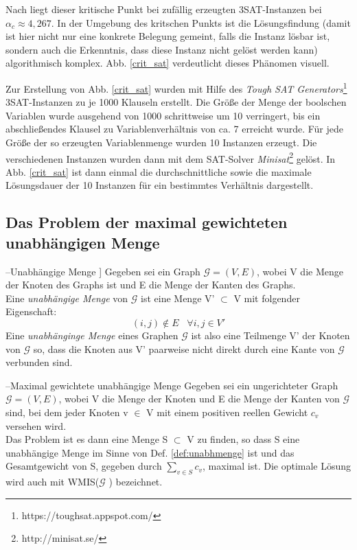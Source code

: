 \documentclass[runningheads]{llncs}
\begin{document}
Nach \cite{mezard2002random} liegt dieser kritische Punkt bei zufällig erzeugten 3SAT-Instanzen bei \\$\alpha_{c} \approx 4,267$. In der Umgebung des kritschen Punkts ist die Lösungsfindung (damit ist hier nicht nur eine konkrete Belegung gemeint, falls die Instanz lösbar ist, sondern auch die Erkenntnis, dass diese Instanz nicht gelöst werden kann) algorithmisch komplex. Abb. \ref{crit_sat} verdeutlicht dieses Phänomen visuell.

Zur Erstellung von Abb. \ref{crit_sat} wurden mit Hilfe des \emph{Tough SAT Generators}\footnote{https://toughsat.appspot.com/} 3SAT-Instanzen zu je 1000 Klauseln erstellt. Die Größe der  Menge der boolschen Variablen wurde ausgehend von 1000 schrittweise um 10 verringert, bis ein abschließendes Klausel zu Variablenverhältnis von ca. 7 erreicht wurde. Für jede Größe der so erzeugten Variablenmenge wurden 10 Instanzen erzeugt. Die verschiedenen Instanzen wurden dann mit dem SAT-Solver \emph{Minisat}\footnote{http://minisat.se/} gelöst. In Abb. \ref{crit_sat} ist dann einmal die durchschnittliche sowie die maximale Lösungsdauer der 10 Instanzen für ein bestimmtes Verhältnis dargestellt.
\subsection{Das Problem der maximal gewichteten unabhängigen Menge}\label{chap:wmis}

--Unabhängige Menge \cite{feo1994greedy}]\label{def:unabhmenge}
Gegeben sei ein Graph $\mathcal{G} = (V,E)$, wobei V die Menge der Knoten des Graphs ist und E die Menge der Kanten des Graphs.\\Eine \emph{unabhängige Menge} von $\mathcal{G}$ ist eine Menge V' $\subset$ V mit folgender Eigenschaft:
\begin{equation}
(i,j) \notin E \;\;\;\forall i,j \in V' 
\end{equation}
Eine \emph{unabhänginge Menge} eines Graphen $\mathcal{G}$ ist also eine Teilmenge V' der Knoten von $\mathcal{G}$ so, dass die Knoten aus V' paarweise nicht direkt durch eine Kante von $\mathcal{G}$  verbunden sind.

--Maximal gewichtete unabhängige Menge \cite{choi2010adiabatic}
Gegeben sei ein ungerichteter Graph $\mathcal{G} = (V, E)$, wobei V die Menge der Knoten und E die Menge der Kanten von $\mathcal{G}$ sind, bei dem jeder Knoten v $\in$ V mit einem positiven reellen Gewicht $c_{v}$ versehen wird.\\
Das Problem ist es dann eine Menge S $\subset$ V zu finden, so dass S eine unabhängige Menge im Sinne von Def. \ref{def:unabhmenge} ist und das Gesamtgewicht von S, gegeben durch $\sum_{v \in S} c_{v}$, maximal ist. Die optimale Lösung wird auch mit WMIS($\mathcal{G}$ ) bezeichnet.
\end{document}
